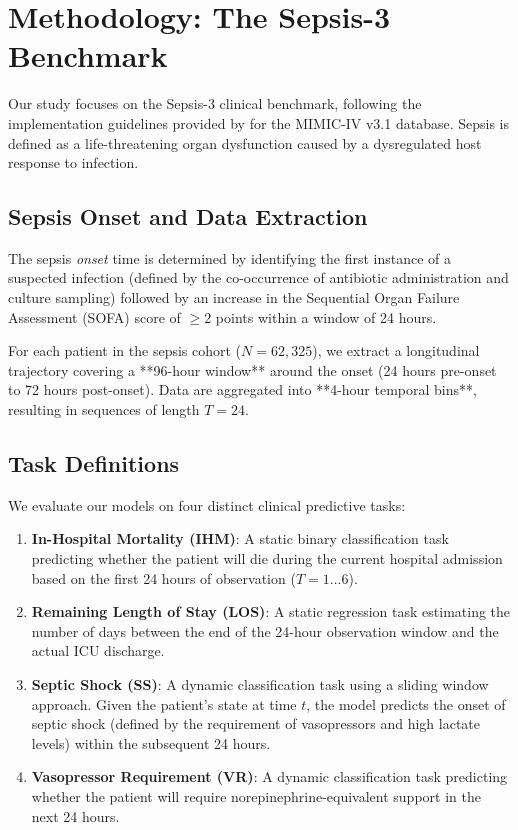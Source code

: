 \section{Methodology: The Sepsis-3 Benchmark}
\label{sec:methodology}

Our study focuses on the Sepsis-3 clinical benchmark, following the implementation guidelines provided by \cite{huang2025} for the MIMIC-IV v3.1 database. Sepsis is defined as a life-threatening organ dysfunction caused by a dysregulated host response to infection.

\subsection{Sepsis Onset and Data Extraction}
The sepsis \textit{onset} time is determined by identifying the first instance of a suspected infection (defined by the co-occurrence of antibiotic administration and culture sampling) followed by an increase in the Sequential Organ Failure Assessment (SOFA) score of $\geq 2$ points within a window of 24 hours. 

For each patient in the sepsis cohort ($N=62,325$), we extract a longitudinal trajectory covering a **96-hour window** around the onset (24 hours pre-onset to 72 hours post-onset). Data are aggregated into **4-hour temporal bins**, resulting in sequences of length $T=24$.

\subsection{Task Definitions}
We evaluate our models on four distinct clinical predictive tasks:
\begin{enumerate}
    \item \textbf{In-Hospital Mortality (IHM)}: A static binary classification task predicting whether the patient will die during the current hospital admission based on the first 24 hours of observation ($T=1 \dots 6$).
    \item \textbf{Remaining Length of Stay (LOS)}: A static regression task estimating the number of days between the end of the 24-hour observation window and the actual ICU discharge.
    \item \textbf{Septic Shock (SS)}: A dynamic classification task using a sliding window approach. Given the patient's state at time $t$, the model predicts the onset of septic shock (defined by the requirement of vasopressors and high lactate levels) within the subsequent 24 hours.
    \item \textbf{Vasopressor Requirement (VR)}: A dynamic classification task predicting whether the patient will require norepinephrine-equivalent support in the next 24 hours.
\end{enumerate}

